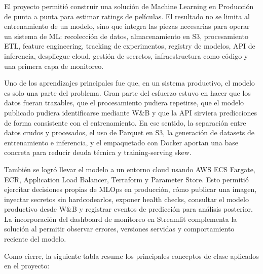 \documentclass[letterpaper,12pt]{article}
\begin{document}
El proyecto permitió construir una solución de Machine Learning en Producción de punta a punta para estimar ratings de películas. El resultado no se limita al entrenamiento de un modelo, sino que integra las piezas necesarias para operar un sistema de ML: recolección de datos, almacenamiento en S3, procesamiento ETL, feature engineering, tracking de experimentos, registry de modelos, API de inferencia, despliegue cloud, gestión de secretos, infraestructura como código y una primera capa de monitoreo.

Uno de los aprendizajes principales fue que, en un sistema productivo, el modelo es solo una parte del problema. Gran parte del esfuerzo estuvo en hacer que los datos fueran trazables, que el procesamiento pudiera repetirse, que el modelo publicado pudiera identificarse mediante W\&B y que la API sirviera predicciones de forma consistente con el entrenamiento. En ese sentido, la separación entre datos crudos y procesados, el uso de Parquet en S3, la generación de datasets de entrenamiento e inferencia, y el empaquetado con Docker aportan una base concreta para reducir deuda técnica y training-serving skew.

También se logró llevar el modelo a un entorno cloud usando AWS ECS Fargate, ECR, Application Load Balancer, Terraform y Parameter Store. Esto permitió ejercitar decisiones propias de MLOps en producción, cómo publicar una imagen, inyectar secretos sin hardcodearlos, exponer health checks, consultar el modelo productivo desde W\&B y registrar eventos de predicción para análisis posterior. La incorporación del dashboard de monitoreo en Streamlit complementa la solución al permitir observar errores, versiones servidas y comportamiento reciente del modelo.

Como cierre, la siguiente tabla resume los principales conceptos de clase aplicados en el proyecto:
\end{document}
